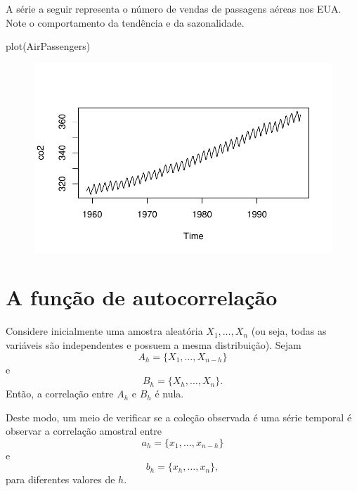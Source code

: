 \documentclass[
  letterpaper,
  DIV=11,
  numbers=noendperiod]{scrreprt}
\newenvironment{Shaded}{\begin{snugshade}}{\end{snugshade}}
\newcommand{\FunctionTok}[1]{\textcolor[rgb]{0.28,0.35,0.67}{#1}}
\newcommand{\NormalTok}[1]{\textcolor[rgb]{0.00,0.23,0.31}{#1}}
\begin{document}
A série a seguir representa o número de vendas de passagens aéreas nos
EUA. Note o comportamento da tendência e da sazonalidade.

\begin{Shaded}
\begin{Highlighting}[]
\FunctionTok{plot}\NormalTok{(AirPassengers)}
\end{Highlighting}
\end{Shaded}

\begin{figure}[H]

{\centering \includegraphics{sinal_files/figure-pdf/unnamed-chunk-1-1.pdf}

}

\end{figure}


\hypertarget{a-funuxe7uxe3o-de-autocorrelauxe7uxe3o}{%
\chapter{A função de
autocorrelação}\label{a-funuxe7uxe3o-de-autocorrelauxe7uxe3o}}

Considere inicialmente uma amostra aleatória \(X_1,\ldots,X_n\) (ou
seja, todas as variáveis são independentes e possuem a mesma
distribuição). Sejam \[A_h=\{X_1,\ldots,X_{n-h}\}\] e
\[B_h=\{X_h,\ldots,X_n\}.\] Então, a correlação entre \(A_h\) e \(B_h\)
é nula.

Deste modo, um meio de verificar se a coleção observada é uma série
temporal é observar a correlação amostral entre
\[a_h=\{x_1,\ldots,x_{n-h}\}\] e \[b_h=\{x_h,\ldots,x_n\},\] para
diferentes valores de \(h\).
\end{document}
